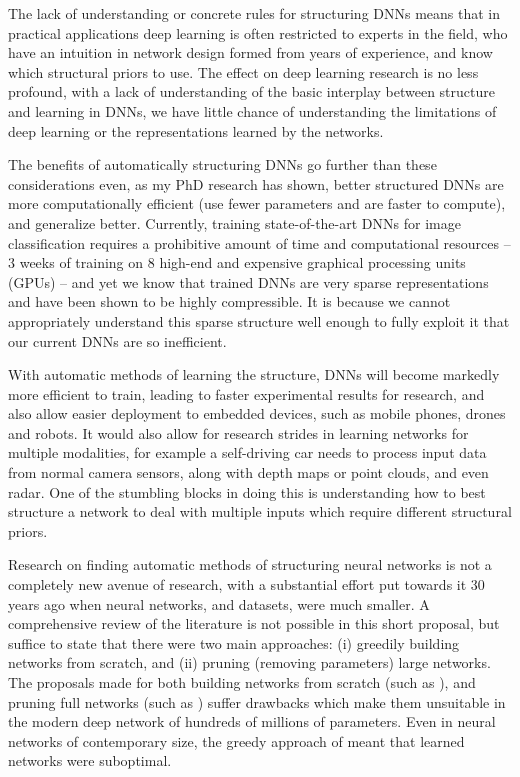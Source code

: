 \documentclass[thesis]{subfiles}
\begin{document}
The lack of understanding or concrete rules for structuring DNNs means that in practical applications deep learning is often restricted to experts in the field, who have an intuition in network design formed from years of experience, and know which structural priors to use. The effect on deep learning research is no less profound, with a lack of understanding of the basic interplay between structure and learning in DNNs, we have little chance of understanding the limitations of deep learning or the representations learned by the networks. 

The benefits of automatically structuring DNNs go further than these considerations even, as my PhD research has shown, better structured DNNs are more computationally efficient (use fewer parameters and are faster to compute), and generalize better. Currently, training state-of-the-art DNNs for image classification requires a prohibitive amount of time and computational resources -- 3 weeks of training on 8 high-end and expensive graphical processing units (GPUs) -- and yet we know that trained DNNs are very sparse representations and have been shown to be highly compressible. It is because we cannot appropriately understand this sparse structure well enough to fully exploit it that our current DNNs are so inefficient.

With automatic methods of learning the structure, DNNs will become markedly more efficient to train, leading to faster experimental results for research, and also allow easier deployment to embedded devices, such as mobile phones, drones and robots. It would also allow for research strides in learning networks for multiple modalities, for example a self-driving car needs to process input data from normal camera sensors, along with depth maps or point clouds, and even radar. One of the stumbling blocks in doing this is understanding how to best structure a network to deal with multiple inputs which require different structural priors.

Research on finding automatic methods of structuring neural networks is not a completely new avenue of research, with a substantial effort put towards it 30 years ago when neural networks, and datasets, were much smaller. A comprehensive review of the literature is not possible in this short proposal, but suffice to state that there were two main approaches: (i) greedily building networks from scratch, and (ii) pruning (removing parameters) large networks. The proposals made for both building networks from scratch (such as \citep{Fahlman1989}), and pruning full networks (such as \citep{lecun1989optimal}) suffer drawbacks which make them unsuitable in the modern deep network of hundreds of millions of parameters. Even in neural networks of contemporary size, the greedy approach of \citet{Fahlman1989} meant that learned networks were suboptimal. %
\end{document}
